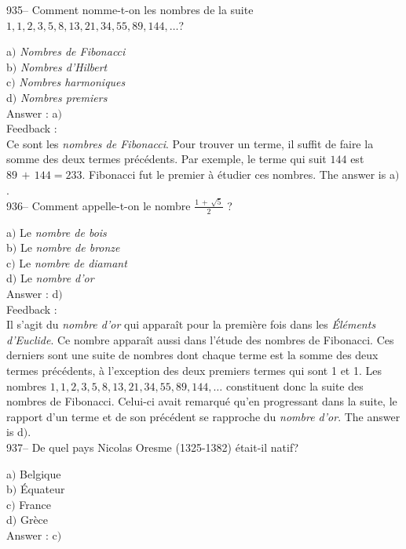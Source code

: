 \documentclass[letterpaper, 12pt]{article}
\begin{document}
935-- Comment nomme-t-on les nombres de la suite
$1,1,2,3,5,8,13,21,34,55,89,144, \ldots$?

a$)$ {\sl Nombres de Fibonacci} \\
b$)$ {\sl Nombres d'Hilbert} \\
c$)$ {\sl Nombres harmoniques} \\
d$)$ {\sl Nombres premiers}\\

Answer : a$)$\\

Feedback : \\
Ce sont les {\sl nombres de Fibonacci}. Pour trouver un terme, il
suffit de faire la somme des deux termes pr\'ec\'edents. Par
exemple, le terme qui suit $144$ est $89\,+\,144=233$. Fibonacci fut
le premier \`a
\'etudier ces nombres. The answer is a$)$.\\

936-- Comment appelle-t-on le nombre $\frac{1\,+\,\sqrt5}2$ ?

a$)$ Le {\sl nombre de bois} \\
b$)$ Le {\sl nombre de bronze} \\
c$)$ Le {\sl nombre de diamant} \\
d$)$ Le {\sl nombre d'or}\\

Answer : d$)$\\

Feedback : \\
Il s'agit du {\sl nombre d'or} qui appara\^it pour la premi\`ere
fois dans les {\sl \'El\'ements d'Euclide}. Ce nombre appara\^it
aussi dans l'\'etude des nombres de Fibonacci. Ces derniers sont une
suite de nombres dont chaque terme est la somme des deux termes
pr\'ec\'edents,  \`a l'exception des deux premiers termes qui sont 1
et 1. Les nombres $1,1,2,3,5,8,13,21,34,55,89,144, \ldots$
constituent donc la suite des nombres de Fibonacci. Celui-ci avait
remarqu\'e qu'en progressant dans la suite, le rapport d'un terme et
de son pr\'ec\'edent
se rapproche du {\sl nombre d'or}. The answer is d$)$.\\

937-- De quel pays Nicolas Oresme (1325-1382) \'etait-il natif?

a$)$ Belgique \\
b$)$ \'Equateur  \\
c$)$ France \\
d$)$ Gr\`ece\\

Answer : c$)$\\
\end{document}
